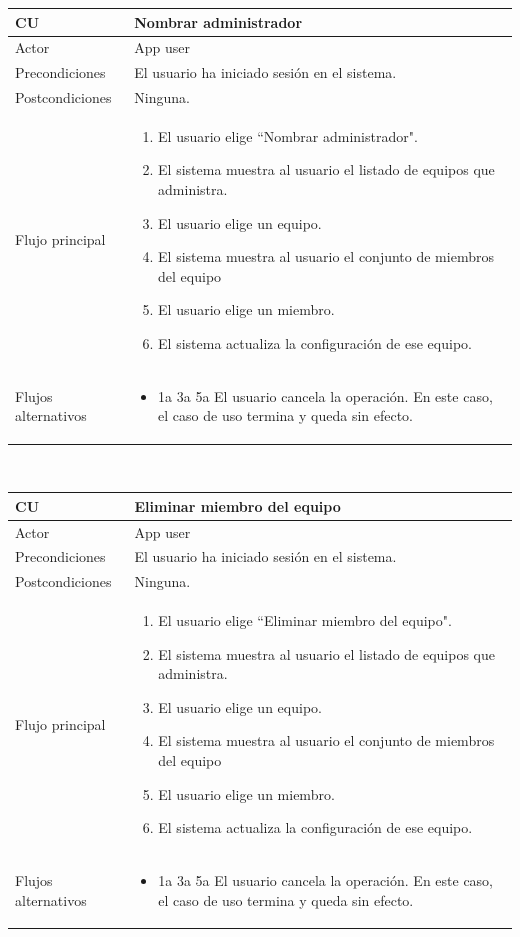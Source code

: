 \documentclass[twoside]{report}
\newcommand\addrow[2]{#1 &#2\\ }
\newcommand\addheading[2]{#1 &#2\\ \hline}
\newcommand\tabularhead{\begin{tabular}{lp{0.7\textwidth}}
\hline
}
\newenvironment{usecase}{\tabularhead}
{\hline\end{tabular}}
\begin{document}
\begin{usecase}
  \addheading{\textbf{CU\arabic{usecase}}}{Nombrar administrador} 
  \addrow{Actor}{App user}
  \addrow{Precondiciones}{El usuario ha iniciado sesión en el sistema.}
  \addrow{Postcondiciones}{Ninguna.}
  \addrow{Flujo principal}{
  		\begin{enumerate}
  		\item El usuario elige “Nombrar administrador". %
  		\item El sistema muestra al usuario el listado de equipos que administra. %
  		\item El usuario elige un equipo. %
  		\item El sistema muestra al usuario el conjunto de miembros del equipo %
  		\item El usuario elige un miembro. %
  		\item El sistema actualiza la configuración de ese equipo. %
  		\end{enumerate}
  }
  \addrow{Flujos alternativos}{
  		\begin{itemize}
  		\item 1a 3a 5a El usuario cancela la operación. En este caso, el caso de uso termina y queda sin efecto.
  		\end{itemize}
  }
\end{usecase}\\

\begin{usecase}
  \addheading{\textbf{CU\arabic{usecase}}}{Eliminar miembro del equipo} 
  \addrow{Actor}{App user}
  \addrow{Precondiciones}{El usuario ha iniciado sesión en el sistema.}
  \addrow{Postcondiciones}{Ninguna.}
  \addrow{Flujo principal}{
  		\begin{enumerate}
  		\item El usuario elige “Eliminar miembro del equipo". %
  		\item El sistema muestra al usuario el listado de equipos que administra. %
  		\item El usuario elige un equipo. %
  		\item El sistema muestra al usuario el conjunto de miembros del equipo %
  		\item El usuario elige un miembro. %
  		\item El sistema actualiza la configuración de ese equipo. %
  		\end{enumerate}
  }
  \addrow{Flujos alternativos}{
  		\begin{itemize}
  		\item 1a 3a 5a El usuario cancela la operación. En este caso, el caso de uso termina y queda sin efecto.
  		\end{itemize}
  }
\end{usecase}\\
\end{document}
